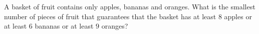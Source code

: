 A basket of fruit contains only apples, bananas and oranges. What is the smallest number of pieces of fruit that guarantees that the basket has at least $8$ apples or at least $6$ bananas or at least $9$ oranges?
